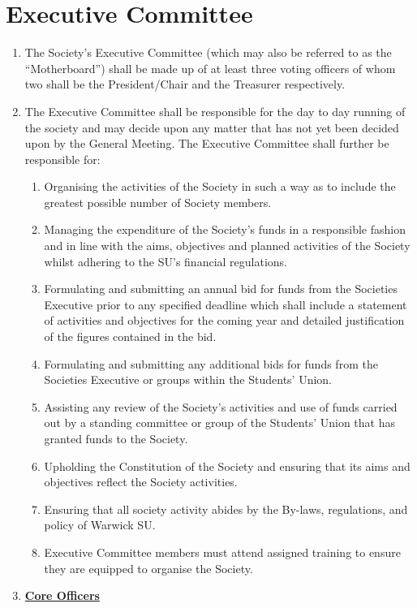 \documentclass{article}
\begin{document}
\section{Executive Committee}
\begin{enumerate}
    \item The Society's Executive Committee (which may also be referred to as the ``Motherboard'') shall be made up of at least three voting officers of whom two shall be the President/Chair and the Treasurer respectively.
    \item The Executive Committee shall be responsible for the day to day running of the society and may decide upon any matter that has not yet been decided upon by the General Meeting. The Executive Committee shall further be responsible for:
    \begin{enumerate}
        \item Organising the activities of the Society in such a way as to include the greatest possible number of Society members.
        \item Managing the expenditure of the Society's funds in a responsible fashion and in line with the aims, objectives and planned activities of the Society whilst adhering to the SU's financial regulations.
        \item Formulating and submitting an annual bid for funds from the Societies Executive prior to any specified deadline which shall include a statement of activities and objectives for the coming year and detailed justification of the figures contained in the bid.
        \item Formulating and submitting any additional bids for funds from the Societies Executive or groups within the Students' Union.
        \item Assisting any review of the Society's activities and use of funds carried out by a standing committee or group of the Students' Union that has granted funds to the Society.
        \item Upholding the Constitution of the Society and ensuring that its aims and objectives reflect the Society activities.
        \item Ensuring that all society activity abides by the By-laws, regulations, and policy of Warwick SU.
        \item Executive Committee members must attend assigned training to ensure they are equipped to organise the Society.
    \end{enumerate}
    \item \textbf{\underline{Core Officers}}

\end{enumerate}
\end{document}
